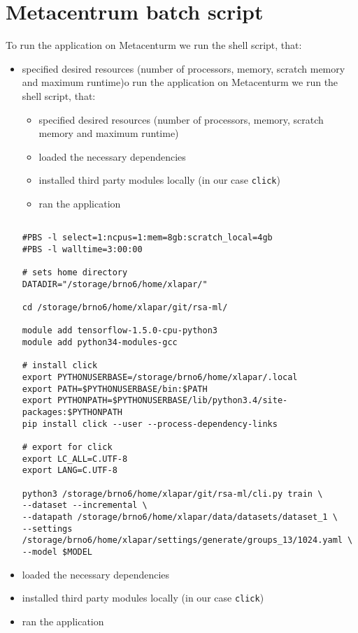 \chapter{Metacentrum batch script}
\label{appendix-metacentrum}

To run the application on Metacenturm we run the shell script, that:

\begin{itemize}

\item specified desired resources (number of processors, memory, scratch memory and maximum runtime)o run the application on Metacenturm we run the shell script, that:

\begin{itemize}

\item specified desired resources (number of processors, memory, scratch memory and maximum runtime)

\item loaded the necessary dependencies

\item installed third party modules locally (in our case \texttt{click})

\item ran the application

\end{itemize}

\begin{verbatim}

#PBS -l select=1:ncpus=1:mem=8gb:scratch_local=4gb
#PBS -l walltime=3:00:00

# sets home directory
DATADIR="/storage/brno6/home/xlapar/"

cd /storage/brno6/home/xlapar/git/rsa-ml/

module add tensorflow-1.5.0-cpu-python3
module add python34-modules-gcc

# install click
export PYTHONUSERBASE=/storage/brno6/home/xlapar/.local
export PATH=$PYTHONUSERBASE/bin:$PATH
export PYTHONPATH=$PYTHONUSERBASE/lib/python3.4/site-packages:$PYTHONPATH
pip install click --user --process-dependency-links

# export for click
export LC_ALL=C.UTF-8
export LANG=C.UTF-8

python3 /storage/brno6/home/xlapar/git/rsa-ml/cli.py train \
--dataset --incremental \
--datapath /storage/brno6/home/xlapar/data/datasets/dataset_1 \
--settings /storage/brno6/home/xlapar/settings/generate/groups_13/1024.yaml \
--model $MODEL

\end{verbatim}


\item loaded the necessary dependencies

\item installed third party modules locally (in our case \texttt{click})

\item ran the application

\end{itemize}

